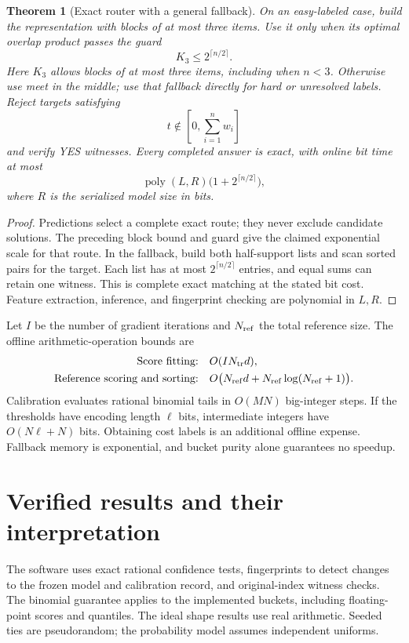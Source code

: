 \documentclass[10pt,letterpaper]{article}
\newtheorem{theorem}{Theorem}
\newcommand{\poly}{\operatorname{poly}}
\begin{document}
\begin{samepage}
\begin{theorem}[Exact router with a general fallback]\label{thm:router}
On an easy-labeled case, build the representation with blocks of at most three items. Use it only when its optimal overlap product passes the guard
\[
 K_3\le2^{\lceil n/2\rceil}.
\]
Here $K_3$ allows blocks of at most three items, including when $n<3$. Otherwise use meet in the middle; use that fallback directly for hard or unresolved labels. Reject targets satisfying
\[
 t\notin\left[0,\sum_{i=1}^nw_i\right]
\]
and verify YES witnesses. Every completed answer is exact, with online bit time at most
\[
 \poly(L,R)\bigl(1+2^{\lceil n/2\rceil}\bigr),
\]
where $R$ is the serialized model size in bits.
\end{theorem}
\end{samepage}
\begin{proof}
Predictions select a complete exact route; they never exclude candidate solutions. The preceding block bound and guard give the claimed exponential scale for that route. In the fallback, build both half-support lists and scan sorted pairs for the target. Each list has at most $2^{\lceil n/2\rceil}$ entries, and equal sums can retain one witness. This is complete exact matching at the stated bit cost. Feature extraction, inference, and fingerprint checking are polynomial in $L,R$.
\end{proof}
Let $I$ be the number of gradient iterations and $N_{\rm ref}$ the total reference size. The offline arithmetic-operation bounds are
\[
 \begin{aligned}
 \text{Score fitting:}&\quad O(IN_{\rm tr}d),\\
 \text{Reference scoring and sorting:}&\quad
 O\bigl(N_{\rm ref}d+N_{\rm ref}\log(N_{\rm ref}+1)\bigr).
 \end{aligned}
\]
Calibration evaluates rational binomial tails in $O(MN)$ big-integer steps. If the thresholds have encoding length $\ell$ bits, intermediate integers have $O(N\ell+N)$ bits. Obtaining cost labels is an additional offline expense. Fallback memory is exponential, and bucket purity alone guarantees no speedup.

\section{Verified results and their interpretation}
The software uses exact rational confidence tests, fingerprints to detect changes to the frozen model and calibration record, and original-index witness checks. The binomial guarantee applies to the implemented buckets, including floating-point scores and quantiles. The ideal shape results use real arithmetic. Seeded ties are pseudorandom; the probability model assumes independent uniforms.
\end{document}
